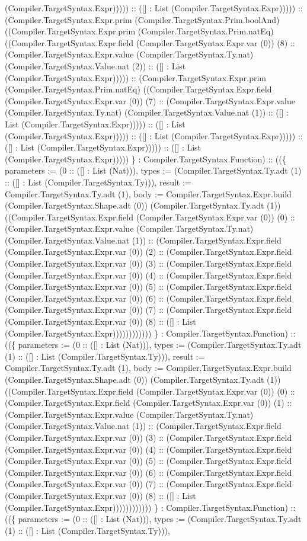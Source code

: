 \documentclass[11pt]{article}
\begin{document}
(Compiler.TargetSyntax.Expr))))) :: ([] : List (Compiler.TargetSyntax.Expr))))) :: (Compiler.TargetSyntax.Expr.prim (Compiler.TargetSyntax.Prim.boolAnd) ((Compiler.TargetSyntax.Expr.prim (Compiler.TargetSyntax.Prim.natEq) ((Compiler.TargetSyntax.Expr.field (Compiler.TargetSyntax.Expr.var (0)) (8) :: (Compiler.TargetSyntax.Expr.value (Compiler.TargetSyntax.Ty.nat) (Compiler.TargetSyntax.Value.nat (2)) :: ([] : List (Compiler.TargetSyntax.Expr))))) :: (Compiler.TargetSyntax.Expr.prim (Compiler.TargetSyntax.Prim.natEq) ((Compiler.TargetSyntax.Expr.field (Compiler.TargetSyntax.Expr.var (0)) (7) :: (Compiler.TargetSyntax.Expr.value (Compiler.TargetSyntax.Ty.nat) (Compiler.TargetSyntax.Value.nat (1)) :: ([] : List (Compiler.TargetSyntax.Expr))))) :: ([] : List (Compiler.TargetSyntax.Expr))))) :: ([] : List (Compiler.TargetSyntax.Expr))))) :: ([] : List (Compiler.TargetSyntax.Expr))))) :: ([] : List (Compiler.TargetSyntax.Expr))))) \} : Compiler.TargetSyntax.Function) :: ((\{ parameters := (0 :: ([] : List (Nat))), types := (Compiler.TargetSyntax.Ty.adt (1) :: ([] : List (Compiler.TargetSyntax.Ty))), result := Compiler.TargetSyntax.Ty.adt (1), body := Compiler.TargetSyntax.Expr.build (Compiler.TargetSyntax.Shape.adt (0)) (Compiler.TargetSyntax.Ty.adt (1)) ((Compiler.TargetSyntax.Expr.field (Compiler.TargetSyntax.Expr.var (0)) (0) :: (Compiler.TargetSyntax.Expr.value (Compiler.TargetSyntax.Ty.nat) (Compiler.TargetSyntax.Value.nat (1)) :: (Compiler.TargetSyntax.Expr.field (Compiler.TargetSyntax.Expr.var (0)) (2) :: (Compiler.TargetSyntax.Expr.field (Compiler.TargetSyntax.Expr.var (0)) (3) :: (Compiler.TargetSyntax.Expr.field (Compiler.TargetSyntax.Expr.var (0)) (4) :: (Compiler.TargetSyntax.Expr.field (Compiler.TargetSyntax.Expr.var (0)) (5) :: (Compiler.TargetSyntax.Expr.field (Compiler.TargetSyntax.Expr.var (0)) (6) :: (Compiler.TargetSyntax.Expr.field (Compiler.TargetSyntax.Expr.var (0)) (7) :: (Compiler.TargetSyntax.Expr.field (Compiler.TargetSyntax.Expr.var (0)) (8) :: ([] : List (Compiler.TargetSyntax.Expr)))))))))))) \} : Compiler.TargetSyntax.Function) :: ((\{ parameters := (0 :: ([] : List (Nat))), types := (Compiler.TargetSyntax.Ty.adt (1) :: ([] : List (Compiler.TargetSyntax.Ty))), result := Compiler.TargetSyntax.Ty.adt (1), body := Compiler.TargetSyntax.Expr.build (Compiler.TargetSyntax.Shape.adt (0)) (Compiler.TargetSyntax.Ty.adt (1)) ((Compiler.TargetSyntax.Expr.field (Compiler.TargetSyntax.Expr.var (0)) (0) :: (Compiler.TargetSyntax.Expr.field (Compiler.TargetSyntax.Expr.var (0)) (1) :: (Compiler.TargetSyntax.Expr.value (Compiler.TargetSyntax.Ty.nat) (Compiler.TargetSyntax.Value.nat (1)) :: (Compiler.TargetSyntax.Expr.field (Compiler.TargetSyntax.Expr.var (0)) (3) :: (Compiler.TargetSyntax.Expr.field (Compiler.TargetSyntax.Expr.var (0)) (4) :: (Compiler.TargetSyntax.Expr.field (Compiler.TargetSyntax.Expr.var (0)) (5) :: (Compiler.TargetSyntax.Expr.field (Compiler.TargetSyntax.Expr.var (0)) (6) :: (Compiler.TargetSyntax.Expr.field (Compiler.TargetSyntax.Expr.var (0)) (7) :: (Compiler.TargetSyntax.Expr.field (Compiler.TargetSyntax.Expr.var (0)) (8) :: ([] : List (Compiler.TargetSyntax.Expr)))))))))))) \} : Compiler.TargetSyntax.Function) :: ((\{ parameters := (0 :: ([] : List (Nat))), types := (Compiler.TargetSyntax.Ty.adt (1) :: ([] : List (Compiler.TargetSyntax.Ty))), 
\end{document}
